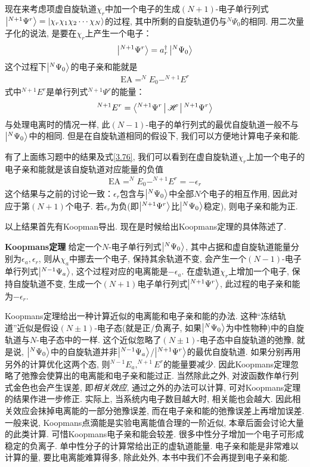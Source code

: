 现在来考虑项虚自旋轨道$\chi_r$中加一个电子的生成$(N+1)$-电子单行列式$\Ket{^{N+1}\Psi^r}=\Ket{\chi_r\chi_1\chi_2\cdots\chi_N}$的过程, 其中所剩的自旋轨道仍与$^N\Psi_0$的相同. 用二次量子化的说法, 是要在$\chi_r$上产生一个电子：
\begin{align}
\Ket{^{N+1}\Psi^r} = a^\dagger_r\Ket{^N\Psi_0}
\end{align}
这个过程下$\Ket{^N\Psi_0}$的电子亲和能就是
\begin{align}
\mathrm{EA} = ^NE_0 - ^{N+1}E^r
\end{align}
式中$ ^{N+1}E^r$是单行列式$^{N+1}\Psi^r$的能量：
\begin{align}
 ^{N+1}E^r = \Braket{^{N+1}\Psi^r|\mathscr{H}|^{N+1}\Psi^r}
\end{align}
与处理电离时的情况一样, 此$(N-1)$-电子的单行列式的最优自旋轨道一般不与$\Ket{^N\Psi_0}$中的相同. 但是在自旋轨道相同的假设下, 我们可以方便地计算电子亲和能.

有了上面练习题中的结果及式\eqref{3.76}, 我们可以看到在虚自旋轨道$\chi_r$上加一个电子的电子亲和能就是该自旋轨道对应能量的负值
\begin{align}
\mathrm{EA} = ^{N}E_0 - ^{N+1}E^r = -\epsilon_r
\end{align}
这个结果与之前的讨论一致：$\epsilon_r$包含与$\Ket{^N\Psi_0}$中全部$N$个电子的相互作用, 因此对应于第$(N+1)$个电子. 若$\epsilon_r$为负(即$\Ket{^{N+1}\Psi^r}$比$\Ket{^N\Psi_0}$稳定), 则电子亲和能为正.

以上结果首先有Koopman导出. 现在是时候给出Koopmans定理的具体陈述了.

\textbf{Koopmans定理} 给定一个$N$-电子\hft 单行列式$\Ket{^N\Psi_0}$, 其中占据和虚自旋轨道能量分别为$\epsilon_a,\epsilon_r$, 则从$\chi_a$中挪去一个电子, 保持其余轨道不变, 会产生一个$(N-1)$-电子单行列式$\Ket{^{N-1}\Psi_a}$, 这个过程对应的电离能是$-\epsilon_a$. 在虚轨道$\chi_r$上增加一个电子, 保持自旋轨道不变, 生成一个$(N+1)$电子单行列式$\Ket{^{N+1}\Psi^r}$, 此过程的电子亲和能为$-\epsilon_r$.

Koopmans定理给出一种计算近似的电离能和电子亲和能的办法. 这种“冻结轨道”近似是假设$(N\pm1)$-电子态(就是正/负离子, 如果$\Ket{^N\Psi_0}$为中性物种)中的自旋轨道与$N$-电子态中的一样. 这个近似忽略了$(N\pm1)$-电子态中自旋轨道的弛豫, 就是说, $\Ket{^N\Psi_0}$中的自旋轨道并非$\Ket{^{N-1}\Psi_a}$/$\Ket{^{N+1}\Psi^r}$的最优自旋轨道. 如果分别再用另外的\hft 计算优化这两个态, 则$^{N-1}E_a,^{N+1}E^r$的能量要减少. 因此Koopmans定理忽略了弛豫会使算出的电离能和电子亲和能过正. 当然除此之外, 对波函数作单行列式金色也会产生误差, 即\emph{相关效应}, 通过\hft 之外的办法可以计算, 可对Koopmans定理的结果作进一步修正. 实际上, 当系统内电子数目越大时, 相关能也会越大. 因此相关效应会抹掉电离能的一部分弛豫误差, 而在电子亲和能的弛豫误差上再增加误差. 一般来说, Koopmans点滴能是实验电离能值合理的一阶近似, 本章后面会讨论大量的此类计算. 可惜Koopmans电子亲和能会较差. 很多中性分子增加一个电子可形成稳定的负离子. 单中性分子的\hft 计算常给出正的虚轨道能量. 电子亲和能是非常难以计算的量, 要比电离能难算得多, 除此处外, 本书中我们不会再提到电子亲和能.

